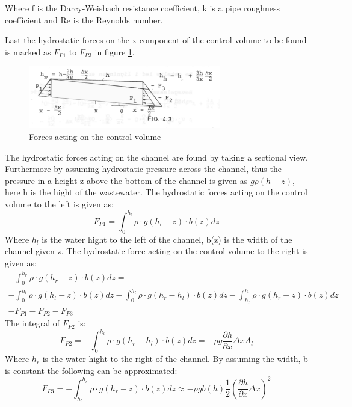 Where f is the Darcy-Weisbach resistance coefficient, k is a pipe roughness coefficient and Re is the Reynolds number.

Last the hydrostatic forces on the x component of the control volume to be found is marked as $F_{P1}$ to $F_{P3}$ in figure \ref{fig:forces_on_CV}. 

\begin{figure}[H]
\centering
\includegraphics[width=0.75\textwidth]{report/modeling/pictures/palle_fig}
\caption{Forces acting on the control volume }
\label{fig:forces_on_CV}
\end{figure}

The hydrostatic forces acting on the channel are found by taking a sectional view. Furthermore by assuming hydrostatic pressure across the channel, thus the pressure in a height z above the bottom of the channel is given as $g\rho(h-z)$, here h is the hight of the wastewater.  
The hydrostatic forces acting on the control volume to the left is given as:
\begin{equation}\label{eq:P1}
	F_{P1} = \int_{0}^{h_l} \rho \cdot g (h_l - z)\cdot b(z) dz
\end{equation}
Where $h_l$ is the water hight to the left of the channel, b(z) is the width of the channel given z. The hydrostatic force acting on the control volume to the right is given as:
\begin{equation}\label{eq:P2}
\begin{array}{l}
	-\int_{0}^{h_r} \rho \cdot g (h_r - z)\cdot b(z)dz = \\
	-\int_{0}^{h_l} \rho \cdot g (h_l - z)\cdot b(z)dz -\int_{0}^{h_l} \rho \cdot g (h_r- h_l)\cdot b(z)dz -\int_{h_l}^{h_r} \rho \cdot g (h_r - z)\cdot b(z)dz = \\
	-F_{P1} - F_{P2} - F_{P3}
\end{array}	
\end{equation}
The integral of $F_{P2}$ is: 
\begin{equation}
	F_{P2} = -\int_{0}^{h_l} \rho \cdot g (h_r - h_l)\cdot b(z)dz = -\rho g \frac{\partial h}{\partial x}\Delta x A_l
\end{equation}
Where $h_r$ is the water hight to the right of the channel. By assuming the width, b is constant the following can be approximated: 
\begin{equation}
	F_{P3}= -\int_{h_l}^{h_r} \rho \cdot g (h_r - z)\cdot b(z)dz \approx -\rho g b(h) \frac{1}{2}\left(\frac{\partial h}{\partial x}\Delta x\right)^2
\end{equation}	

